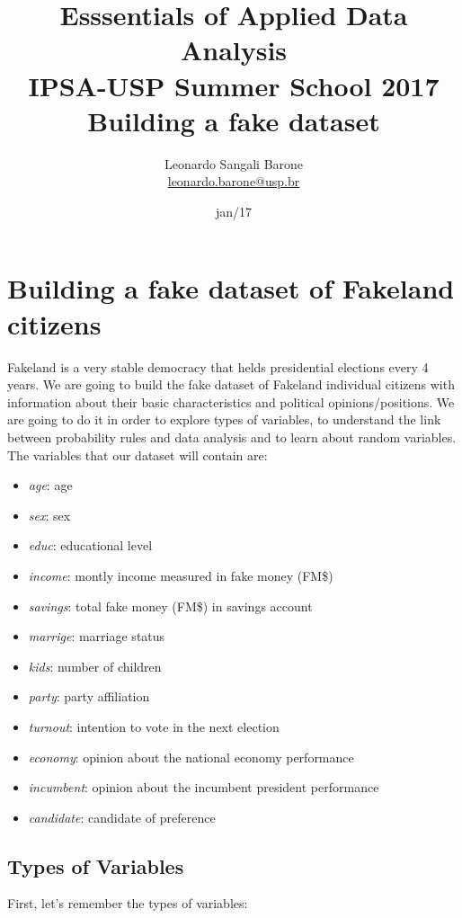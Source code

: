 \documentclass[11pt]{article}
\title{\textbf{Esssentials of Applied Data Analysis\\
				IPSA-USP Summer School 2017}\newline\\
				Building a fake dataset}
\author{Leonardo Sangali Barone\\ \href{leonardo.barone@usp.br}{leonardo.barone@usp.br}}
\date{jan/17}
\begin{document}
\maketitle

\section*{Building a fake dataset of Fakeland citizens}

	Fakeland is a very stable democracy that helds presidential elections every 4 years. We are going to build the fake dataset of Fakeland individual citizens with information about their basic characteristics and political opinions/positions. We are going to do it in order to explore types of variables, to understand the link between probability rules and data analysis and to learn about random variables.\\
	
	The variables that our dataset will contain are:
	
	\begin{itemize}

	\item \emph{age}: age
	\item \emph{sex}: sex
	\item \emph{educ}: educational level
	\item \emph{income}: montly income measured in fake money (FM\$)
	\item \emph{savings}: total fake money (FM\$) in savings account
	\item \emph{marrige}: marriage status
	\item \emph{kids}: number of children
	\item \emph{party}: party affiliation
	\item \emph{turnout}: intention to vote in the next election
	\item \emph{economy}: opinion about the national economy performance
	\item \emph{incumbent}: opinion about the incumbent president performance
	\item \emph{candidate}: candidate of preference
	
	\end{itemize}
	
	\subsection*{Types of Variables}

	First, let's remember the types of variables:\\
	
\end{document}
